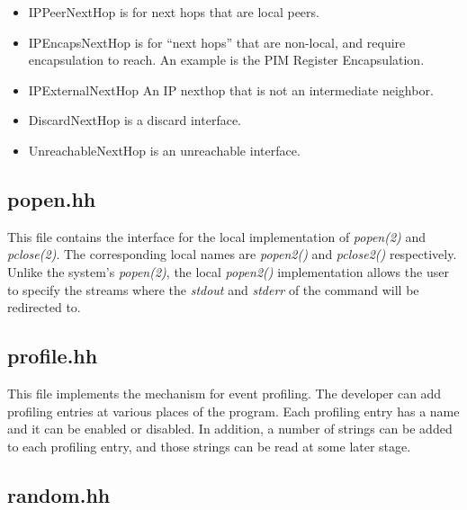 \documentclass[11pt]{article}
\begin{document}
\begin{itemize}

  \item IPPeerNextHop is for next hops that are local peers.

  \item IPEncapsNextHop is for ``next hops'' that are non-local, and require
  encapsulation to reach. An example is the PIM Register Encapsulation.

  \item IPExternalNextHop An IP nexthop that is not an intermediate
  neighbor.

  \item DiscardNextHop is a discard interface.

  \item UnreachableNextHop is an unreachable interface.

\end{itemize}

\subsection{popen.hh}

This file contains the interface for the local implementation
of \emph{popen(2)} and \emph{pclose(2)}.
The corresponding local names are \emph{popen2()} and \emph{pclose2()}
respectively. Unlike the system's \emph{popen(2)}, the local
\emph{popen2()} implementation allows the user to specify the streams
where the \emph{stdout} and \emph{stderr} of the command will be
redirected to.

\subsection{profile.hh}

This file implements the mechanism for event profiling.
The developer can add profiling entries at various places of the program.
Each profiling entry has a name and it can be enabled or disabled.
In addition, a number of strings can be added to each profiling entry,
and those strings can be read at some later stage.


\subsection{random.hh}
\end{document}
